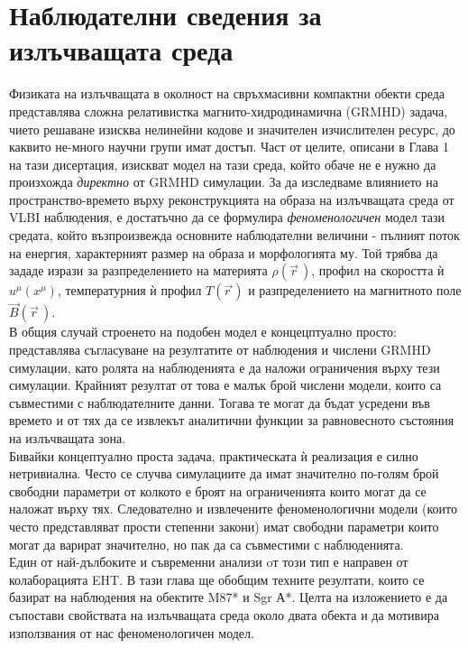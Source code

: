 \section{Наблюдателни сведения за излъчващата среда}

Физиката на излъчващата в околност на свръхмасивни компактни обекти среда представлява сложна релативистка магнито-хидродинамична (GRMHD) задача, чието решаване изисква нелинейни кодове и значителен изчислителен ресурс, до каквито не-много научни групи имат достъп. Част от целите, описани в Глава 1 на тази дисертация, изискват модел на тази среда, който обаче не е нужно да произхожда \emph{директно} от GRMHD симулации. За да изследваме влиянието на пространство-времето върху реконструкцията на образа на излъчващата среда от VLBI наблюдения, е достатъчно да се формулира \emph{феноменологичен} модел тази средата, който възпроизвежда основните наблюдателни величини - пълният поток на енергия, характерният размер на образа и морфологията му. Той трябва да зададе изрази за разпределението на материята $\rho(\vec{r}\,)$, профил на скоростта ѝ $u^\mu (x^\mu)$, температурния ѝ профил $T(\vec{r\,})$ и разпределението на магнитното поле $\vec{B}(\vec{r}\,)$.\\

В общия случай строенето на подобен модел е концецптуално просто: представлява съгласуване на резултатите от наблюдения и числени GRMHD симулации, като ролята на наблюденията е да наложи ограничения върху тези симулации. Крайният резултат от това е малък брой числени модели, които са съвместими с наблюдателните данни. Тогава те могат да бъдат усредени във времето и от тях да се извлекът аналитични функции за равновесното състояния на излъчващата зона.\\ 

Бивайки концептуално проста задача, практическата ѝ реализация е силно нетривиална. Често се случва симулациите да имат значително по-голям брой свободни параметри от колкото е броят на ограниченията които могат да се наложат върху тях. Следователно и извлечените феноменологични модели (които често представляват прости степенни закони) имат свободни параметри които могат да варират значително, но пак да са съвместими с наблюденията.\\

Един от най-дълбоките и съвременни анализи oт този тип е направен от колаборацията EHT. В тази глава ще обобщим техните резултати, които се базират на наблюдения на обектите M87* и Sgr А*. Целта на изложението е да съпостави свойствата на излъчващата среда около двата обекта и да мотивира използвания от нас феноменологичен модел.
\newpage
